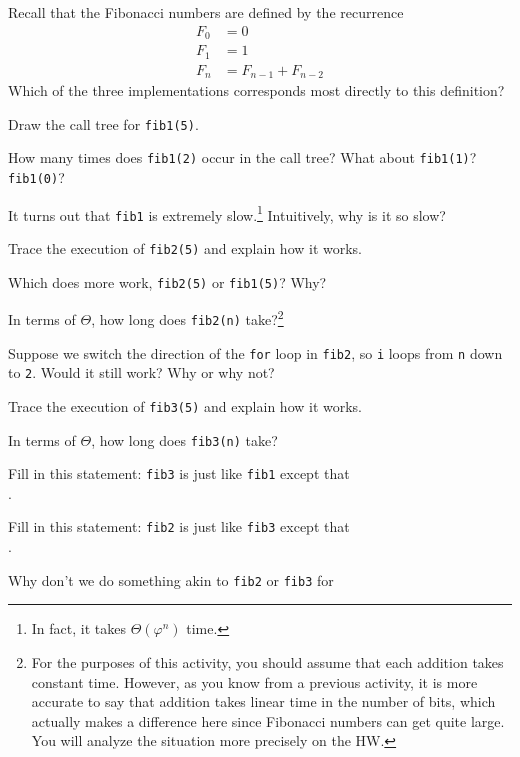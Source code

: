 \documentclass{tufte-handout}
\begin{document}
\begin{questions}
\item Recall that the Fibonacci numbers are defined by the recurrence
  \begin{align*}
    F_0 &= 0 \\ F_1 &= 1 \\ F_n &= F_{n-1} + F_{n-2}
  \end{align*}
  Which of the three implementations corresponds most directly to
  this definition?
\item Draw the call tree for \verb|fib1(5)|. \vspace{1in}
\item How many times does \verb|fib1(2)| occur in the call tree?
  What about \verb|fib1(1)|?  \verb|fib1(0)|?
\item It turns out that \verb|fib1| is extremely slow.\footnote{In
    fact, it takes $\Theta(\varphi^n)$ time.}  Intuitively, why is it
  so slow?
\item Trace the execution of \verb|fib2(5)| and explain how it works. \vspace{1in}
\item Which does more work, \verb|fib2(5)| or \verb|fib1(5)|?  Why?
\newpage
\item In terms of $\Theta$, how long does \verb|fib2(n)|
  take?\footnote{For the purposes of this activity, you should assume
    that each addition takes constant time.  However, as you know from
    a previous activity, it is more accurate to say that addition
    takes linear time in the number of bits, which actually makes a
    difference here since Fibonacci numbers can get quite large.  You
    will analyze the situation more precisely on the HW.}
\item Suppose we switch the direction of the \verb|for| loop in
  \verb|fib2|, so \verb|i| loops from \verb|n| down to \verb|2|.
  Would it still work?  Why or why not?
\item Trace the execution of \verb|fib3(5)| and explain how it works. \vspace{1in}
\item In terms of $\Theta$, how long does \verb|fib3(n)| take?
\item Fill in this statement: \verb|fib3| is just like \verb|fib1|
  except that \\ \blank.
\item Fill in this statement: \verb|fib2| is just like \verb|fib3|
  except that \\ \blank.
\item Why don't we do something akin to \verb|fib2| or \verb|fib3| for

\end{questions}
\end{document}
